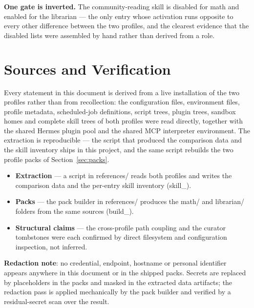 \documentclass[10pt]{article}
\newcommand{\mono}[1]{{\ttfamily\small #1}}
\begin{document}
\textbf{One gate is inverted.} The community-reading skill is disabled for math and enabled for the
librarian --- the only entry whose activation runs opposite to every other difference between the two
profiles, and the clearest evidence that the disabled lists were assembled by hand rather than
derived from a role.

\section*{Sources and Verification}\label{sec:sources}

Every statement in this document is derived from a live installation of the two profiles rather
than from recollection: the configuration files, environment files, profile metadata, scheduled-job
definitions, script trees, plugin trees, sandbox homes and complete skill trees of both profiles
were read directly, together with the shared Hermes plugin pool and the shared MCP interpreter
environment. The extraction is reproducible --- the script that produced the comparison data and the
skill inventory ships in this project, and the same script rebuilds the two profile packs of
Section~\ref{sec:packs}.

\begin{itemize}
    \item \textbf{Extraction} --- a script in \mono{references/} reads both profiles and writes the
    comparison data and the per-entry skill inventory (\mono{skill\_}\allowbreak\mono{inventory.md}).
    \item \textbf{Packs} --- the pack builder in \mono{references/} produces the \mono{math/} and
    \mono{librarian/} folders from the same sources
    (\mono{build\_}\allowbreak\mono{profile\_}\allowbreak\mono{packs.py}).
    \item \textbf{Structural claims} --- the cross-profile path coupling and the curator tombstones were each confirmed by direct
    filesystem and configuration inspection, not inferred.
\end{itemize}

\textbf{Redaction note}: no credential, endpoint, hostname or personal identifier appears anywhere
in this document or in the shipped packs. Secrets are replaced by placeholders in the packs and
masked in the extracted data artifacts; the redaction pass is applied mechanically by the pack
builder and verified by a residual-secret scan over the result.
\end{document}
